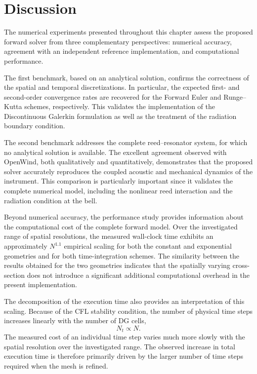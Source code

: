 \documentclass[11pt,a4paper]{report}
\theoremstyle{plain}
\theoremstyle{definition}
\begin{document}
\section{Discussion}

The numerical experiments presented throughout this chapter assess the
proposed forward solver from three complementary perspectives: numerical
accuracy, agreement with an independent reference implementation, and
computational performance.

The first benchmark, based on an analytical solution, confirms the correctness
of the spatial and temporal discretizations. In particular, the expected
first- and second-order convergence rates are recovered for the Forward Euler
and Runge--Kutta schemes, respectively. This validates the implementation of
the Discontinuous Galerkin formulation as well as the treatment of the
radiation boundary condition.

The second benchmark addresses the complete reed--resonator system, for which
no analytical solution is available. The excellent agreement observed with
OpenWind, both qualitatively and quantitatively, demonstrates that the proposed
solver accurately reproduces the coupled acoustic and mechanical dynamics of
the instrument. This comparison is particularly important since it validates
the complete numerical model, including the nonlinear reed interaction and the
radiation condition at the bell.

Beyond numerical accuracy, the performance study provides information about
the computational cost of the complete forward model. Over the investigated
range of spatial resolutions, the measured wall-clock time exhibits an
approximately $N^{1.1}$ empirical scaling for both the constant and
exponential geometries and for both time-integration schemes. The similarity
between the results obtained for the two geometries indicates that the
spatially varying cross-section does not introduce a significant additional
computational overhead in the present implementation.

The decomposition of the execution time also provides an interpretation of
this scaling. Because of the CFL stability condition, the number of physical
time steps increases linearly with the number of DG cells,
\[
N_t \propto N.
\]
The measured cost of an individual time step varies much more slowly with the
spatial resolution over the investigated range. The observed increase in total
execution time is therefore primarily driven by the larger number of time
steps required when the mesh is refined.
\end{document}
